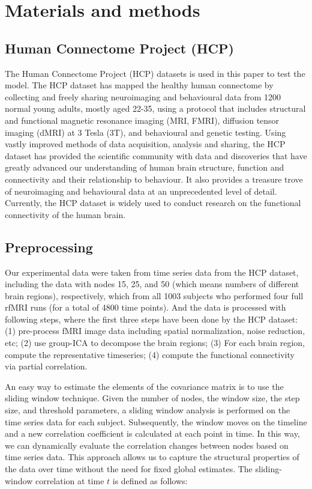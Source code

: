 \documentclass[11pt]{article}
\begin{document}
\section{Materials and methods}

\subsection{Human Connectome Project (HCP)}

The Human Connectome Project (HCP) datasets\cite{Glasser2013-ha}\cite{Van_Essen2012-gc} is used in this paper to test the model. The HCP dataset has mapped the healthy human connectome by collecting and freely sharing neuroimaging and behavioural data from 1200 normal young adults, mostly aged 22-35, using a protocol that includes structural and functional magnetic resonance imaging (MRI, FMRI), diffusion tensor imaging (dMRI) at 3 Tesla (3T), and behavioural and genetic testing. Using vastly improved methods of data acquisition, analysis and sharing, the HCP dataset has provided the scientific community with data and discoveries that have greatly advanced our understanding of human brain structure, function and connectivity and their relationship to behaviour. It also provides a treasure trove of neuroimaging and behavioural data at an unprecedented level of detail. Currently, the HCP dataset is widely used to conduct research on the functional connectivity of the human brain.


\subsection{Preprocessing}

Our experimental data were taken from time series data from the HCP dataset, including the data with nodes 15, 25, and 50 (which means numbers of different brain regions), respectively, which from all 1003 subjects who performed four full rfMRI runs (for a total of 4800 time points). And the data is processed with following steps\cite{Filippini2009-so}\cite{Beckmann2004-jg}\cite{Smith2011-ki}\cite{Smith2013-gg}, where the first three steps have been done by the HCP dataset: (1) pre-process fMRI image data including spatial normalization, noise reduction, etc; (2) use group-ICA to decompose the brain regions; (3) For each brain region, compute the representative timeseries; (4) compute the functional connectivity via partial correlation.

An easy way to estimate the elements of the covariance matrix is to use the sliding window technique\cite{Allen2014-tl}. Given the number of nodes, the window size, the step size, and threshold parameters, a sliding window analysis is performed on the time series data for each subject. Subsequently, the window moves on the timeline and a new correlation coefficient is calculated at each point in time. In this way, we can dynamically evaluate the correlation changes between nodes based on time series data. This approach allows us to capture the structural properties of the data over time without the need for fixed global estimates. The sliding-window correlation at time $t$ is defined as follows:
\end{document}
